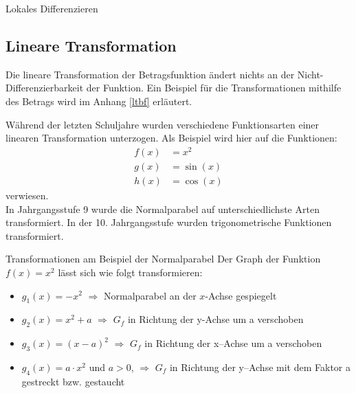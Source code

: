 \begin{section}{Lokales Differenzieren}
\subsection{Lineare Transformation}
\begin{bem*}{}
Die lineare Transformation der Betragsfunktion ändert nichts an der Nicht-Differenzierbarkeit der Funktion. Ein Beispiel für die Transformationen mithilfe des Betrags wird im Anhang \ref{ltbf} erläutert.
\end{bem*}
Während der letzten Schuljahre wurden verschiedene Funktionsarten einer linearen Transformation unterzogen. Als Beispiel wird hier auf die Funktionen: 
 \begin{equation*}
    \begin{split}
        f(x) &= x^2\\
        g(x) &= \sin{(x)}\\
        h(x) &= \cos{(x)}
    \end{split}
\end{equation*}
verwiesen.\\ 
In Jahrgangsstufe 9 wurde die Normalparabel auf unterschiedlichste Arten transformiert. In der 10. Jahrgangsstufe wurden trigonometrische Funktionen transformiert.
\begin{bsp*}{Transformationen am Beispiel der Normalparabel}{}
Der Graph der Funktion $f(x) = x^2$ lässt sich wie folgt transformieren:
\begin{itemize}
\item $g_1(x) = -x^2$ $\Longrightarrow$ Normalparabel an der $x$-Achse gespiegelt
\item $g_2(x) =   x^2 +a$ $\Longrightarrow$ $G_f$ in Richtung der y-Achse um a verschoben
\item $g_3(x) =(x-a)^2$ $\Longrightarrow$ $G_f$ in Richtung der x--Achse um a verschoben
\item $g_4(x) =a\cdot x^2$ und $a>0$, $\Longrightarrow$ $G_f$ in Richtung der y--Achse mit dem Faktor a gestreckt bzw. gestaucht
\end{itemize}
\end{bsp*}


\end{section}
